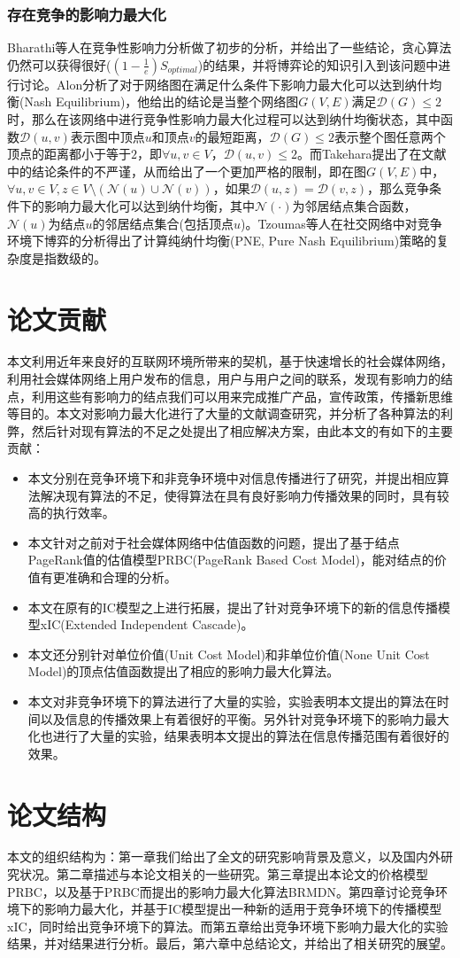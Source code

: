 \subsubsection{存在竞争的影响力最大化}
Bharathi等人在\cite{bharathi2007competitive}竞争性影响力分析做了初步的分析，并给出了一些结论，贪心算法仍然可以获得很好($(1-\frac{1}{e}) S_{optimal}$)的结果，并将博弈论的知识引入到该问题中进行讨论。Alon\cite{alon2010note}分析了对于网络图在满足什么条件下影响力最大化可以达到纳什均衡(Nash Equilibrium)，他给出的结论是当整个网络图$G(V, E)$满足$\mathcal{D}(G) \le 2$时，那么在该网络中进行竞争性影响力最大化过程可以达到纳什均衡状态，其中函数$\mathcal{D}(u, v)$表示图中顶点$u$和顶点$v$的最短距离，$\mathcal{D}(G) \le 2$表示整个图任意两个顶点的距离都小于等于$2$，即$\forall u, v \in V$，$\mathcal{D}(u,v) \le 2$。而Takehara\cite{takehara2012comment}提出了在文献\cite{alon2010note}中的结论条件的不严谨，从而给出了一个更加严格的限制，即在图$G(V, E)$中，$\forall u, v \in V, z \in V\setminus (\mathcal{N}(u)\cup\mathcal{N}(v))$，如果$\mathcal{D}(u,z)=\mathcal{D}(v,z)$，那么竞争条件下的影响力最大化可以达到纳什均衡，其中$\mathcal{N}(\cdot)$为邻居结点集合函数，$\mathcal{N}(u)$为结点$u$的邻居结点集合(包括顶点$u$)。Tzoumas\cite{tzoumas2012game}等人在社交网络中对竞争环境下博弈的分析得出了计算纯纳什均衡(PNE, Pure Nash Equilibrium)策略的复杂度是指数级的。


\section{论文贡献}
本文利用近年来良好的互联网环境所带来的契机，基于快速增长的社会媒体网络，利用社会媒体网络上用户发布的信息，用户与用户之间的联系，发现有影响力的结点，利用这些有影响力的结点我们可以用来完成推广产品，宣传政策，传播新思维等目的。本文对影响力最大化进行了大量的文献调查研究，并分析了各种算法的利弊，然后针对现有算法的不足之处提出了相应解决方案，由此本文的有如下的主要贡献：
\begin{itemize}
\item 本文分别在竞争环境下和非竞争环境中对信息传播进行了研究，并提出相应算法解决现有算法的不足，使得算法在具有良好影响力传播效果的同时，具有较高的执行效率。
\item 本文针对之前对于社会媒体网络中估值函数的问题，提出了基于结点PageRank值的估值模型PRBC(PageRank Based Cost Model)，能对结点的价值有更准确和合理的分析。
\item 本文在原有的IC模型之上进行拓展，提出了针对竞争环境下的新的信息传播模型xIC(Extended Independent Cascade)。
\item 本文还分别针对单位价值(Unit Cost Model)和非单位价值(None Unit Cost Model)的顶点估值函数提出了相应的影响力最大化算法。
\item 本文对非竞争环境下的算法进行了大量的实验，实验表明本文提出的算法在时间以及信息的传播效果上有着很好的平衡。另外针对竞争环境下的影响力最大化也进行了大量的实验，结果表明本文提出的算法在信息传播范围有着很好的效果。
\end{itemize}



\section{论文结构}
本文的组织结构为：第一章我们给出了全文的研究影响背景及意义，以及国内外研究状况。第二章描述与本论文相关的一些研究。第三章提出本论文的价格模型PRBC，以及基于PRBC而提出的影响力最大化算法BRMDN。第四章讨论竞争环境下的影响力最大化，并基于IC模型提出一种新的适用于竞争环境下的传播模型xIC，同时给出竞争环境下的算法。而第五章给出竞争环境下影响力最大化的实验结果，并对结果进行分析。最后，第六章中总结论文，并给出了相关研究的展望。